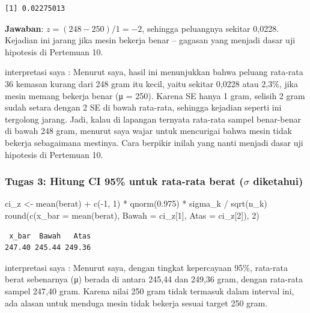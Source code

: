 \documentclass[
  indonesian,
  letterpaper,
]{book}
\newenvironment{Shaded}{\begin{snugshade}}{\end{snugshade}}
\newcommand{\AttributeTok}[1]{\textcolor[rgb]{0.40,0.45,0.13}{#1}}
\newcommand{\DecValTok}[1]{\textcolor[rgb]{0.68,0.00,0.00}{#1}}
\newcommand{\FloatTok}[1]{\textcolor[rgb]{0.68,0.00,0.00}{#1}}
\newcommand{\FunctionTok}[1]{\textcolor[rgb]{0.28,0.35,0.67}{#1}}
\newcommand{\NormalTok}[1]{\textcolor[rgb]{0.00,0.23,0.31}{#1}}
\newcommand{\OtherTok}[1]{\textcolor[rgb]{0.00,0.23,0.31}{#1}}
\newcommand{\SpecialCharTok}[1]{\textcolor[rgb]{0.37,0.37,0.37}{#1}}
\begin{document}
\begin{verbatim}
[1] 0.02275013
\end{verbatim}

\textbf{Jawaban}: \(z = (248 - 250)/1 = -2\), sehingga peluangnya
sekitar 0,0228. Kejadian ini jarang jika mesin bekerja benar -- gagasan
yang menjadi dasar uji hipotesis di Pertemuan 10.

interpretasi saya : Menurut saya, hasil ini menunjukkan bahwa peluang
rata-rata 36 kemasan kurang dari 248 gram itu kecil, yaitu sekitar
0,0228 atau 2,3\%, jika mesin memang bekerja benar (μ = 250). Karena SE
hanya 1 gram, selisih 2 gram sudah setara dengan 2 SE di bawah
rata-rata, sehingga kejadian seperti ini tergolong jarang. Jadi, kalau
di lapangan ternyata rata-rata sampel benar-benar di bawah 248 gram,
menurut saya wajar untuk mencurigai bahwa mesin tidak bekerja
sebagaimana mestinya. Cara berpikir inilah yang nanti menjadi dasar uji
hipotesis di Pertemuan 10.

\subsubsection{\texorpdfstring{Tugas 3: Hitung CI 95\% untuk rata-rata
berat (\(\sigma\)
diketahui)}{Tugas 3: Hitung CI 95\% untuk rata-rata berat (\textbackslash sigma diketahui)}}\label{tugas-3-hitung-ci-95-untuk-rata-rata-berat-sigma-diketahui}

\begin{Shaded}
\begin{Highlighting}[]
\NormalTok{ci\_z }\OtherTok{\textless{}{-}} \FunctionTok{mean}\NormalTok{(berat) }\SpecialCharTok{+} \FunctionTok{c}\NormalTok{(}\SpecialCharTok{{-}}\DecValTok{1}\NormalTok{, }\DecValTok{1}\NormalTok{) }\SpecialCharTok{*} \FunctionTok{qnorm}\NormalTok{(}\FloatTok{0.975}\NormalTok{) }\SpecialCharTok{*}\NormalTok{ sigma\_k }\SpecialCharTok{/} \FunctionTok{sqrt}\NormalTok{(n\_k)}
\FunctionTok{round}\NormalTok{(}\FunctionTok{c}\NormalTok{(}\AttributeTok{x\_bar =} \FunctionTok{mean}\NormalTok{(berat), }\AttributeTok{Bawah =}\NormalTok{ ci\_z[}\DecValTok{1}\NormalTok{], }\AttributeTok{Atas =}\NormalTok{ ci\_z[}\DecValTok{2}\NormalTok{]), }\DecValTok{2}\NormalTok{)}
\end{Highlighting}
\end{Shaded}

\begin{verbatim}
 x_bar  Bawah   Atas 
247.40 245.44 249.36 
\end{verbatim}

interpretasi saya : Menurut saya, dengan tingkat kepercayaan 95\%,
rata-rata berat sebenarnya (μ) berada di antara 245,44 dan 249,36 gram,
dengan rata-rata sampel 247,40 gram. Karena nilai 250 gram tidak
termasuk dalam interval ini, ada alasan untuk menduga mesin tidak
bekerja sesuai target 250 gram.
\end{document}
